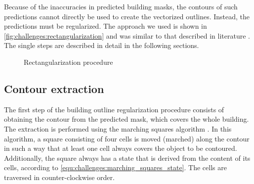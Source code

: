 Because of the inaccuracies in predicted building masks, the contours of such predictions cannot directly be used to create the vectorized outlines. Instead, the predictions must be regularized. The approach we used is shown in \autoref{fig:challenges:rectangularization} and was similar to that described in literature \cite{Partovi.2017}. The single steps are described in detail in the following sections.

\begin{figure}[H]
\centering
{}
	\caption{Rectangularization procedure}
	\label{fig:challenges:rectangularization}
\end{figure}

\subsection{Contour extraction}
The first step of the building outline regularization procedure consists of obtaining the contour from the predicted mask, which covers the whole building. The extraction is performed using the marching squares algorithm \cite{Maple.2003}. In this algorithm, a square consisting of four cells is moved (marched) along the contour in such a way that at least one cell always covers the object to be contoured. Additionally, the square always has a state that is derived from the content of its cells, according to \eqref{equ:challenges:marching_squares_state}. The cells are traversed in counter-clockwise order.

